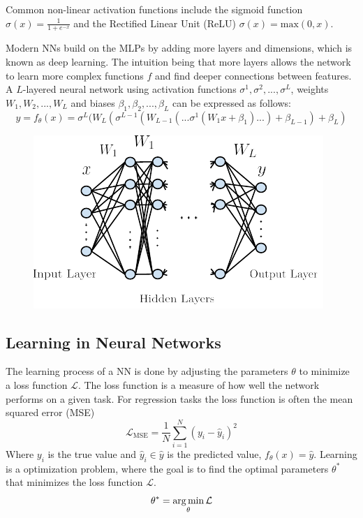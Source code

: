 Common non-linear activation functions include the sigmoid function $\sigma(x) = \frac{1}{1+e^{-x}}$ and the Rectified Linear Unit (ReLU) $\sigma(x) = \text{max}(0, x)$. 

Modern NNs build on the MLPs by adding more layers and dimensions, which is known as deep learning. The intuition being that more layers allows the network to learn more complex functions $f$ and find deeper connections between features.
A $L$-layered neural network using activation functions $\sigma^1, \sigma^2, ..., \sigma^L$, weights $W_1, W_2, ..., W_L$ and biases $\beta_1, \beta_2, ..., \beta_L$ can be expressed as follows:
\begin{equation}
    y = f_\theta(x) = \sigma^L(W_L(\sigma^{L-1}(W_{L-1}(...\sigma^1(W_1 x + \beta_1)...)+\beta_{L-1}) + \beta_L)
\end{equation}
\begin{figure}[H]
    \includegraphics[scale=1]{figures/figure-pdf/NN2.pdf}
\end{figure}
\subsection{Learning in Neural Networks}
The learning process of a NN is done by adjusting the parameters $\theta$ to minimize a loss function $\mathcal{L}$. The loss function is a measure of how well the network performs on a given task.
For regression tasks the loss function is often the mean squared error (MSE) 
\begin{equation}
    \mathcal{L}_\text{MSE} = \frac{1}{N}\sum_{i=1}^N (y_i - \hat{y}_i)^2
\end{equation}
Where $y_i$ is the true value and $\hat{y}_i \in \hat{y}$ is the predicted value, $f_\theta(x) = \hat{y}$.
Learning is a optimization problem, where the goal is to find the optimal parameters $\theta^*$ that minimizes the loss function $\mathcal{L}$.
\begin{equation}
    \theta^* = \operatorname*{arg\,min}_\theta \mathcal{L}
\end{equation}


